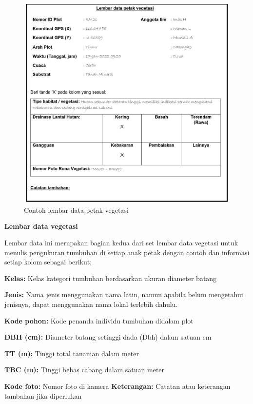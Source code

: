 \documentclass[
]{book}
\begin{document}
\begin{figure}

{\centering \includegraphics[width=1\linewidth]{images/ldv_ip} 

}

\caption{Contoh lembar data petak vegetasi}\label{fig:ldvip}
\end{figure}

\textbf{Lembar data vegetasi}

Lembar data ini merupakan bagian kedua dari set lembar data vegetasi untuk menulis pengukuran tumbuhan di setiap anak petak dengan contoh dan informasi setiap kolom sebagai berikut;

\textbf{Kelas:} Kelas kategori tumbuhan berdasarkan ukuran diameter batang

\textbf{Jenis:} Nama jenis menggunakan nama latin, namun apabila belum mengetahui jenisnya, dapat menggunakan nama lokal terlebih dahulu.

\textbf{Kode pohon:} Kode penanda individu tumbuhan didalam plot

\textbf{DBH (cm):} Diameter batang setinggi dada (Dbh) dalam satuan cm

\textbf{TT (m):} Tinggi total tanaman dalam meter

\textbf{TBC (m):} Tinggi bebas cabang dalam satuan meter

\textbf{Kode foto:} Nomor foto di kamera
\textbf{Keterangan:} Catatan atau keterangan tambahan jika diperlukan
\end{document}
